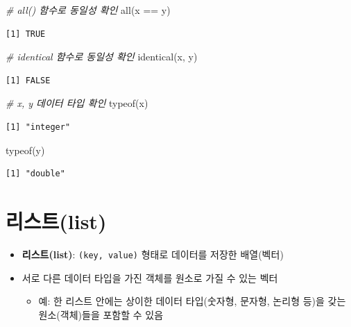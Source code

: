 \documentclass[
  11pt,
]{krantz}
\newenvironment{Shaded}{\begin{snugshade}}{\end{snugshade}}
\newcommand{\CommentTok}[1]{\textcolor[rgb]{0.37,0.37,0.37}{\textit{#1}}}
\newcommand{\FunctionTok}[1]{\textcolor[rgb]{0,0,0}{#1}}
\newcommand{\NormalTok}[1]{#1}
\newcommand{\SpecialCharTok}[1]{\textcolor[rgb]{0,0,0}{#1}}
\providecommand{\tightlist}{%
  \setlength{\itemsep}{0pt}\setlength{\parskip}{0pt}}
\begin{document}
\begin{Shaded}
\begin{Highlighting}[]
\CommentTok{\# all() 함수로 동일성 확인}
\FunctionTok{all}\NormalTok{(x }\SpecialCharTok{==}\NormalTok{ y)}
\end{Highlighting}
\end{Shaded}

\begin{verbatim}
[1] TRUE
\end{verbatim}

\begin{Shaded}
\begin{Highlighting}[]
\CommentTok{\# identical 함수로 동일성 확인}
\FunctionTok{identical}\NormalTok{(x, y)}
\end{Highlighting}
\end{Shaded}

\begin{verbatim}
[1] FALSE
\end{verbatim}

\begin{Shaded}
\begin{Highlighting}[]
\CommentTok{\# x, y 데이터 타입 확인}
\FunctionTok{typeof}\NormalTok{(x)}
\end{Highlighting}
\end{Shaded}

\begin{verbatim}
[1] "integer"
\end{verbatim}

\begin{Shaded}
\begin{Highlighting}[]
\FunctionTok{typeof}\NormalTok{(y)}
\end{Highlighting}
\end{Shaded}

\begin{verbatim}
[1] "double"
\end{verbatim}

\normalsize

\hypertarget{list}{%
\section{리스트(list)}\label{list}}

\begin{itemize}
\tightlist
\item
  \textbf{리스트(list)}: \texttt{(key,\ value)} 형태로 데이터를 저장한 배열(벡터)
\item
  서로 다른 데이터 타입을 가진 객체를 원소로 가질 수 있는 벡터

  \begin{itemize}
  \tightlist
  \item
    예: 한 리스트 안에는 상이한 데이터 타입(숫자형, 문자형, 논리형 등)을 갖는 원소(객체)들을 포함할 수 있음
  \end{itemize}
\end{itemize}
\end{document}
